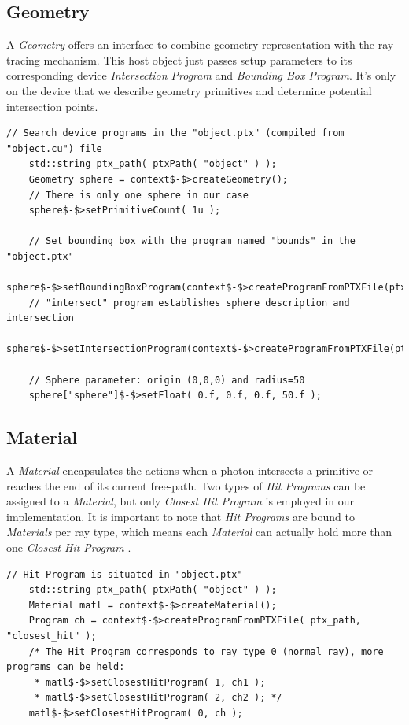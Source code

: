 \subsection{Geometry}
A \textit{Geometry} offers an interface to combine geometry representation with the ray tracing mechanism. This host object just passes setup parameters to its corresponding device \textit{Intersection Program} and \textit{Bounding Box Program}. It's only on the device that we describe geometry primitives and determine potential intersection points.
\begin{lstlisting}[mathescape]
    // Search device programs in the "object.ptx" (compiled from "object.cu") file
    std::string ptx_path( ptxPath( "object" ) );
    Geometry sphere = context$-$>createGeometry();
    // There is only one sphere in our case
    sphere$-$>setPrimitiveCount( 1u );
    
    // Set bounding box with the program named "bounds" in the "object.ptx"
    sphere$-$>setBoundingBoxProgram(context$-$>createProgramFromPTXFile(ptx_path,"bounds"));
    // "intersect" program establishes sphere description and intersection
    sphere$-$>setIntersectionProgram(context$-$>createProgramFromPTXFile(ptx_path,"intersect"));

    // Sphere parameter: origin (0,0,0) and radius=50
    sphere["sphere"]$-$>setFloat( 0.f, 0.f, 0.f, 50.f );
\end{lstlisting}


\subsection{Material}
A \textit{Material} encapsulates the actions when a photon intersects a primitive or reaches the end of its current free-path. Two types of \textit{Hit Programs} can be assigned to a \textit{Material}, but only \textit{Closest Hit Program} is employed in our implementation. It is important to note that \textit{Hit Programs} are bound to \textit{Materials} per ray type, which means each \textit{Material} can actually hold more than one \textit{Closest Hit Program} \cite{Reference6}.
\begin{lstlisting}[mathescape]
    // Hit Program is situated in "object.ptx"
    std::string ptx_path( ptxPath( "object" ) );
    Material matl = context$-$>createMaterial();
    Program ch = context$-$>createProgramFromPTXFile( ptx_path, "closest_hit" );
    /* The Hit Program corresponds to ray type 0 (normal ray), more programs can be held:
     * matl$-$>setClosestHitProgram( 1, ch1 );
     * matl$-$>setClosestHitProgram( 2, ch2 ); */
    matl$-$>setClosestHitProgram( 0, ch );
\end{lstlisting}

